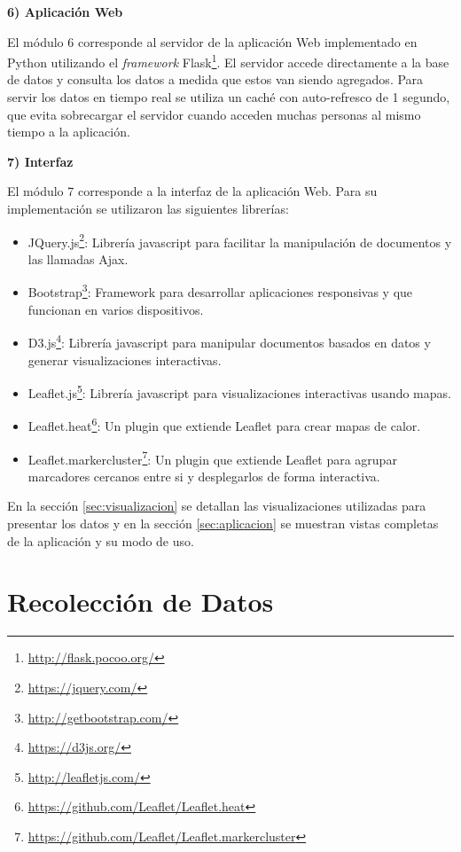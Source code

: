 \noindent\textbf{6) Aplicación Web}

El módulo 6 corresponde al servidor de la aplicación Web implementado en Python utilizando el \textit{framework} Flask\footnote{\url{http://flask.pocoo.org/}}. El servidor accede directamente a la base de datos y consulta los datos a medida que estos van siendo agregados. Para servir los datos en tiempo real se utiliza un caché con auto-refresco de 1 segundo, que evita sobrecargar el servidor cuando acceden muchas personas al mismo tiempo a la aplicación. 

\noindent\textbf{7) Interfaz}

El módulo 7 corresponde a la interfaz de la aplicación Web. Para su implementación se utilizaron las siguientes librerías:
\begin{itemize}
\item JQuery.js\footnote{\url{https://jquery.com/}}: Librería javascript para facilitar la manipulación de documentos y las llamadas Ajax. 
\item Bootstrap\footnote{\url{http://getbootstrap.com/}}: Framework para desarrollar aplicaciones responsivas y que funcionan en varios dispositivos.
\item D3.js\footnote{\url{https://d3js.org/}}: Librería javascript para manipular documentos basados en datos y generar visualizaciones interactivas. %
\item Leaflet.js\footnote{\url{http://leafletjs.com/}}: Librería javascript para visualizaciones interactivas usando mapas. 
\item Leaflet.heat\footnote{\url{https://github.com/Leaflet/Leaflet.heat}}: Un plugin que extiende Leaflet para crear mapas de calor. 
\item Leaflet.markercluster\footnote{\url{https://github.com/Leaflet/Leaflet.markercluster}}: Un plugin que extiende Leaflet para agrupar marcadores cercanos entre si y desplegarlos de forma interactiva. 
\end{itemize}

En la sección \ref{sec:visualizacion} se detallan las visualizaciones utilizadas para presentar los datos y en la sección \ref{sec:aplicacion} se muestran vistas completas de la aplicación y su modo de uso. 

\section{Recolección de Datos}
\label{sec:recoleccion}

